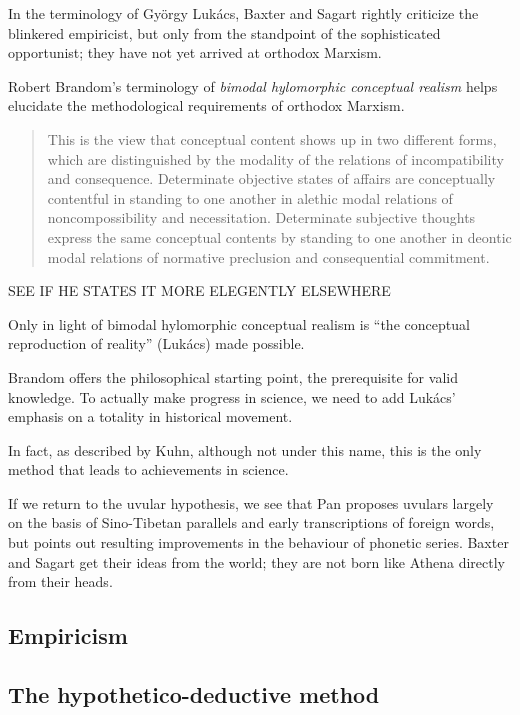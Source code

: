 In the terminology of György Lukács, Baxter and Sagart rightly criticize the blinkered empiricist, but only from the standpoint of the sophisticated opportunist; they have not yet arrived at orthodox Marxism.


Robert Brandom's terminology of
\textit{bimodal hylomorphic conceptual realism} helps elucidate the methodological requirements of orthodox Marxism. 

\begin{quote}
This is the view that conceptual content shows up in two different
forms, which
are distinguished by the modality of the relations of incompatibility and consequence.
Determinate objective states of affairs are conceptually contentful
in standing to one another in alethic modal relations of noncompossibility
and necessitation. Determinate subjective thoughts express the same conceptual
contents by standing to one another in deontic modal relations of normative
preclusion and consequential commitment.
\citep[109]{Brandom2019Spirit}
\end{quote}

SEE IF HE STATES IT MORE ELEGENTLY ELSEWHERE

Only in light of bimodal hylomorphic
conceptual realism is ``the conceptual reproduction of reality'' (Lukács) made possible.

Brandom offers the philosophical starting point, the prerequisite for valid knowledge. To actually make progress in science, we need to add Lukács' emphasis on a totality in historical movement. 

In fact, as described by Kuhn, although not under this name, this is the only method that leads to achievements in science. 

If we return to the uvular hypothesis, we see that 
 Pan proposes uvulars largely on the basis of Sino-Tibetan parallels and early transcriptions of foreign words, but points out resulting improvements in the behaviour of phonetic series. 
 Baxter and Sagart get their ideas from the world; they are not born like Athena directly from their heads. 


\subsection{Empiricism}

\subsection{The hypothetico-deductive method}

